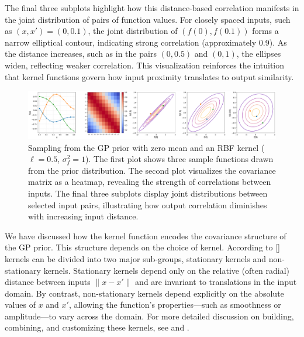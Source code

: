 \documentclass{article}
\begin{document}
\vspace{1em}
\noindent
The final three subplots highlight how this distance-based correlation manifests in the joint distribution of pairs of function values.
For closely spaced inputs, such as \( (x, x') = (0, 0.1) \), the joint distribution of \( (f(0), f(0.1)) \) forms a narrow elliptical contour,
indicating strong correlation (approximately 0.9). As the distance increases, such as in the pairs \( (0, 0.5) \) and \( (0, 1) \), the ellipses widen, reflecting weaker correlation. This visualization reinforces the intuition that kernel functions govern how input proximity translates to output similarity.

\begin{figure}[H]
    \centering
        \includegraphics[width=\textwidth]{LatexPlots/1dplots/Kernel_background.png}
        \caption{Sampling from the GP prior with zero mean and an RBF kernel ($\ell = 0.5$, $\sigma_f^2 = 1$). 
        The first plot shows three sample functions drawn from the prior distribution. 
        The second plot visualizes the covariance matrix as a heatmap, revealing the strength of correlations between inputs.
        The final three subplots display joint distributions between selected input pairs, illustrating how output correlation diminishes with increasing input distance.}
    \label{fig: samples_from_GP_prior}
\end{figure}


\noindent
We have discussed how the kernel function encodes the covariance structure of the GP prior. This structure depends on the choice of kernel. According to [\cite{bible}]
kernels can be divided into two major sub-groups, stationary kernels and non-stationary kernels. 
Stationary kernels depend only on the relative (often radial) distance between inputs \(\|x - x'\|\) and are invariant to translations 
in the input domain. By contrast, non-stationary kernels depend explicitly on 
the absolute values of \(x\) and \(x'\), allowing the function’s properties—such as smoothness 
or amplitude—to vary across the domain. For more detailed discussion on building, combining, and customizing these kernels, 
see \cite{kernelcookbook} and \cite[Ch.~4]{bible}.

\bigskip
\end{document}

